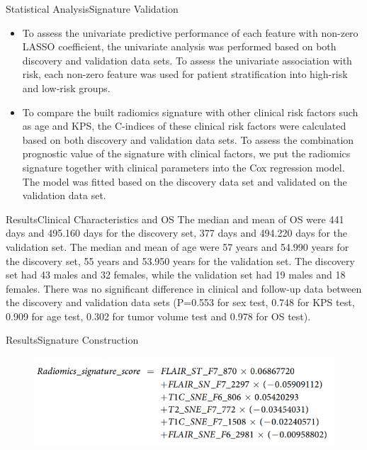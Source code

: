 \documentclass[
]{beamer}
\begin{document}
	\begin{frame}{Statistical Analysis}{Signature Validation}
		\begin{itemize}
			\item To assess the univariate predictive performance of each feature with non-zero LASSO coefficient, the univariate
			analysis was performed based on both discovery and validation data sets. To assess the univariate association
			with risk, each non-zero feature was used for patient stratification into high-risk and low-risk groups.
			\item To compare the built radiomics signature with other clinical risk factors such as age and KPS, the C-indices of
			these clinical risk factors were calculated based on both discovery and validation data sets. To assess the combination
			prognostic value of the signature with clinical factors, we put the radiomics signature together with clinical
			parameters into the Cox regression model. The model was fitted based on the discovery data set and validated on
			the validation data set. 
		\end{itemize}
	\end{frame}
	
	
	\begin{frame}{Results}{Clinical Characteristics and OS}
		The median and mean of OS were 441 days and 495.160 days for the discovery
		set, 377 days and 494.220 days for the validation set. The median and mean of age were 57 years and 54.990
		years for the discovery set, 55 years and 53.950 years for the validation set. The discovery set had 43 males and 32
		females, while the validation set had 19 males and 18 females. There was no significant difference in clinical and
		follow-up data between the discovery and validation data sets (P=0.553 for sex test, 0.748 for KPS test, 0.909 for
		age test, 0.302 for tumor volume test and 0.978 for OS test).
	\end{frame}
	
	
	
	\begin{frame}{Results}{Signature Construction}
		\begin{figure}
			\includegraphics[scale=0.5]{form2}
		\end{figure}
	\end{frame}
	
\end{document}
